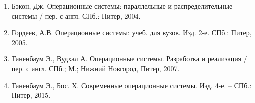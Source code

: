 \begin{enumerate}
\def\labelenumi{\arabic{enumi}.}
\tightlist
\item
  Бэкон, Дж. Операционные системы: параллельные и распределительные
  системы / пер. с англ. СПб.: Питер, 2004.
\item
  Гордеев, А.В. Операционные системы: учеб. для вузов. Изд. 2-е. СПб.:
  Питер, 2005.
\item
  Таненбаум Э., Вудхал А. Операционные системы. Разработка и реализация
  / пер. с англ. СПб.; М.; Нижний Новгород, Питер, 2007.
\item
  Таненбаум Э., Бос. Х. Современные операционные системы. Изд. 4-е. --
  СПб.: Питер, 2015.
\end{enumerate}

\hypertarget{refs}{}
\begin{CSLReferences}{0}{0}
\end{CSLReferences}
